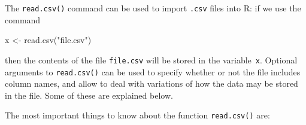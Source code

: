 \documentclass[
  a4paper,
]{article}
\newenvironment{Shaded}{\begin{snugshade}}{\end{snugshade}}
\newcommand{\FunctionTok}[1]{\textcolor[rgb]{0.00,0.00,0.00}{#1}}
\newcommand{\NormalTok}[1]{#1}
\newcommand{\OtherTok}[1]{\textcolor[rgb]{0.56,0.35,0.01}{#1}}
\newcommand{\StringTok}[1]{\textcolor[rgb]{0.31,0.60,0.02}{#1}}
\theoremstyle{definition}
\theoremstyle{definition}
\theoremstyle{definition}
\theoremstyle{definition}
\theoremstyle{remark}
\begin{document}
The \texttt{read.csv()} command can be used to import \texttt{.csv} files
into R: if we use the command

\begin{Shaded}
\begin{Highlighting}[]
\NormalTok{  x }\OtherTok{\textless{}{-}} \FunctionTok{read.csv}\NormalTok{(}\StringTok{"file.csv"}\NormalTok{)}
\end{Highlighting}
\end{Shaded}

then the contents of the file \texttt{file.csv} will be stored in the variable~\texttt{x}.
Optional arguments to \texttt{read.csv()} can be used to specify whether or not the
file includes column names, and allow to deal with variations of how the data
may be stored in the file. Some of these are explained below.

The most important things to
know about the function \texttt{read.csv()} are:
\end{document}
